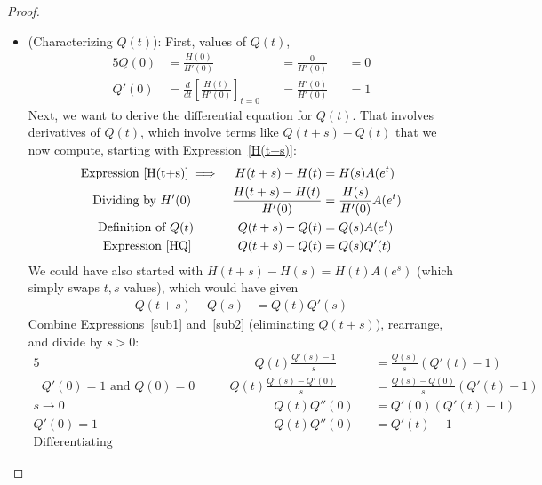\documentclass[12pt]{article}
\theoremstyle{plain}
\theoremstyle{definition}
\theoremstyle{remark}
\newcommand{\ra}{\rightarrow}
\begin{document}
\begin{proof}
\begin{itemize}
  \clearpage
  \item
    (Characterizing $Q(t)$):
    First, values of $Q(t)$,
    \begin{alignat*}{5}
      Q(0) &= \frac{H(0)}{H'(0)} &&= \frac{0}{H'(0)} &&= 0
      \\
      Q'(0) &=
      \frac{d}{dt}\left[\frac{H(t)}{H'(0)}\right]_{t=0}
      &&=
      \frac{H'(0)}{H'(0)} &&= 1
    \end{alignat*}
    Next, we want to derive the differential equation for $Q(t)$.  That
    involves derivatives of $Q(t)$, which involve terms like
    $Q(t+s)-Q(t)$ that we now compute, starting with
    Expression~\ref{H(t+s)}:
    \begin{align}
      \text{Expression~\ref{H(t+s)}}\implies\quad
      H(t+s)-H(t) &= H(s)A(e^t)
      \notag
      \\
      \text{Dividing by $H'(0)$}\qquad\quad\;
      \frac{H(t+s)-H(t)}{H'(0)} &= \frac{H(s)}{H'(0)}A(e^t)
      \notag
      \\
      \text{Definition of $Q(t)$}\qquad\quad\;\;
      Q(t+s)-Q(t)&= Q(s)A(e^t)
      \notag
      \\
      \text{Expression~\ref{HQ}}\qquad\quad\;\;\,
      Q(t+s)-Q(t)&= Q(s)Q'(t)
      \label{sub1}
    \end{align}
    We could have also started with $H(t+s)-H(s)=H(t)A(e^s)$ (which
    simply swaps $t,s$ values), which would have given
    \begin{align}
      Q(t+s)-Q(s)&= Q(t)Q'(s)
      \label{sub2}
    \end{align}
    Combine Expressions~\ref{sub1} and~\ref{sub2} (eliminating
    $Q(t+s)$), rearrange, and divide by $s>0$:
    \begin{alignat*}{5}
      &
      \qquad
      Q(t)\frac{Q'(s)-1}{s}
      &&= \frac{Q(s)}{s}(Q'(t)-1)
      \\
      \text{ $Q'(0)=1$ and $Q(0)=0$}\qquad
      &
      Q(t)\frac{Q'(s)-Q'(0)}{s}
      &&= \frac{Q(s)-Q(0)}{s}(Q'(t)-1)
      \\
      \text{$s\ra0$}\qquad
      &
      \qquad\quad\;\;
      Q(t)Q''(0)
      &&= Q'(0)(Q'(t)-1)
      \\
      \text{$Q'(0)=1$}\qquad
      &
      \qquad\quad\;\;
      Q(t)Q''(0)
      &&= Q'(t)-1
      \\
      \text{Differentiating}\qquad
      &
      \qquad\quad\;\;

\end{alignat*}
\end{itemize}
\end{proof}
\end{document}
